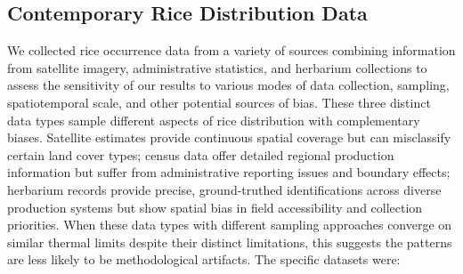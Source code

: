 \documentclass[
  letterpaper,
  DIV=11,
  numbers=noendperiod]{scrartcl}
\begin{document}
\subsection{Contemporary Rice Distribution
Data}\label{contemporary-rice-distribution-data}

We collected rice occurrence data from a variety of sources combining
information from satellite imagery, administrative statistics, and
herbarium collections to assess the sensitivity of our results to
various modes of data collection, sampling, spatiotemporal scale, and
other potential sources of bias. These three distinct data types sample
different aspects of rice distribution with complementary biases.
Satellite estimates provide continuous spatial coverage but can
misclassify certain land cover types; census data offer detailed
regional production information but suffer from administrative reporting
issues and boundary effects; herbarium records provide precise,
ground-truthed identifications across diverse production systems but
show spatial bias in field accessibility and collection priorities. When
these data types with different sampling approaches converge on similar
thermal limits despite their distinct limitations, this suggests the
patterns are less likely to be methodological artifacts. The specific
datasets were:
\end{document}

